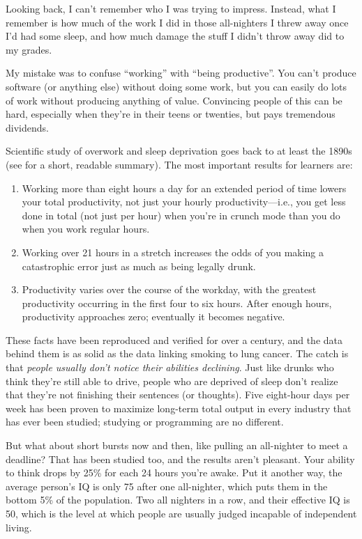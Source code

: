Looking back, I can't remember who I was trying to impress. Instead,
what I remember is how much of the work I did in those all-nighters I
threw away once I'd had some sleep, and how much damage the stuff I
didn't throw away did to my grades.

My mistake was to confuse ``working'' with ``being productive''. You can't
produce software (or anything else) without doing some work, but you can
easily do lots of work without producing anything of value. Convincing
people of this can be hard, especially when they're in their teens or
twenties, but pays tremendous dividends.

Scientific study of overwork and sleep deprivation goes back to at least
the 1890s (see \cite{Robi2005} for a short, readable summary). The
most important results for learners are:

\begin{enumerate}
\item
  Working more than eight hours a day for an extended period of time
  lowers your total productivity, not just your hourly
  productivity---i.e., you get less done in total (not just per hour)
  when you're in crunch mode than you do when you work regular hours.
\item
  Working over 21 hours in a stretch increases the odds of you making
  a catastrophic error just as much as being legally drunk.
\item
  Productivity varies over the course of the workday, with the
  greatest productivity occurring in the first four to six hours.
  After enough hours, productivity approaches zero; eventually it
  becomes negative.
\end{enumerate}

These facts have been reproduced and verified for over a century, and
the data behind them is as solid as the data linking smoking to lung
cancer. The catch is that \emph{people usually don't notice their abilities
declining}. Just like drunks who think they're still able to drive,
people who are deprived of sleep don't realize that they're not
finishing their sentences (or thoughts). Five eight-hour days per week
has been proven to maximize long-term total output in every industry
that has ever been studied; studying or programming are no different.

But what about short bursts now and then, like pulling an all-nighter to
meet a deadline? That has been studied too, and the results aren't
pleasant. Your ability to think drops by 25\% for each 24 hours you're
awake. Put it another way, the average person's IQ is only 75 after one
all-nighter, which puts them in the bottom 5\% of the population. Two all
nighters in a row, and their effective IQ is 50, which is the level at
which people are usually judged incapable of independent living.

